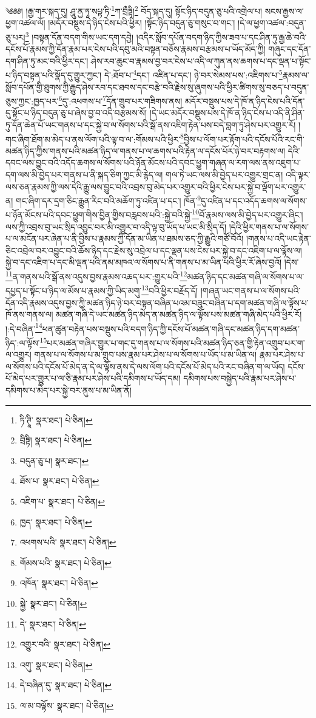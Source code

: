 \setcounter{footnote}{0} 
༄༅༅། །རྒྱ་གར་སྐད་དུ། ཤཱུ་ནྱ་ཏཱ་སཔྟ་ཏི་\footnote{ཏི་ཊཱི་  སྣར་ཐང་།  པེ་ཅིན། }ཀ་བྲྀཏྟི།\footnote{བྲིཏྟི།  སྣར་ཐང་།  པེ་ཅིན། } བོད་སྐད་དུ། སྟོང་ཉིད་བདུན་ཅུ་པའི་འགྲེལ་པ། སངས་རྒྱས་ལ་ཕྱག་འཚལ་ལོ། །མདོར་བསྡུས་དེ་ཉིད་ངེས་པའི་ཕྱིར། །སྟོང་ཉིད་བདུན་ཅུ་གསུང་བ་གང་། །དེ་ལ་ཕྱག་འཚལ་:བདུན་ཅུ་པར།\footnote{བདུན་ཅུ་པ།  སྣར་ཐང་། } །བསྟན་དོན་བདག་གིས་ཡང་དག་དབྱེ། །འདིར་སློབ་དཔོན་བདག་ཉིད་ཀྱིས་ཟབ་པ་དང་ཤིན་ཏུ་རྒྱ་ཆེ་བའི་དངོས་པོ་རྣམས་ཀྱི་དོན་རྣམ་པར་ངེས་པའི་དབུ་མའི་བསྟན་བཅོས་རྣམས་བརྩམས་པ་ཡོད་མོད་ཀྱི། གཞུང་དང་དོན་དག་ཤིན་ཏུ་མང་བའི་ཕྱིར་དང་། ཤེས་རབ་ཆུང་བ་རྣམས་བྱ་བར་ངེས་པ་འདི་ལ་ཀུན་ནས་ཆགས་པ་དང་ལྡན་པ་སྟོང་པ་ཉིད་བསྟན་པའི་སྣོད་དུ་གྱུར་ཀྱང་། དེ་:ཐོབ་པ་\footnote{ཐོས་པ་  སྣར་ཐང་།  པེ་ཅིན། }དང་། འཛིན་པ་དང་། ཉེ་བར་སེམས་པས་:འཇིགས་པ་\footnote{འཇིག་པ་  སྣར་ཐང་།  པེ་ཅིན། }རྣམས་ལ་སློབ་དཔོན་གྱི་ཐུགས་ཀྱི་རྒྱུད་ཤེས་རབ་དང་ཐབས་དང་བརྩེ་བའི་རྗེས་སུ་ཞུགས་པའི་ཕྱིར་ཚིགས་སུ་བཅད་པ་བདུན་ཅུས་ཀྱང་:ཁྱད་པར་\footnote{ཁྱད་  སྣར་ཐང་།  པེ་ཅིན། }དུ་:འཕགས་པ་\footnote{འཕགས་པའི་  སྣར་ཐང་།  པེ་ཅིན། }དོན་གྲུབ་པར་གཟིགས་ནས། མདོར་བསྡུས་པས་དེ་ཁོ་ན་ཉིད་ངེས་པའི་དོན་དུ་སྟོང་པ་ཉིད་བདུན་ཅུ་པ་ཞེས་བྱ་བ་འདི་བརྩམས་སོ། །དེ་ཡང་མདོར་བསྡུས་པས་དེ་ཁོ་ན་ཉིད་ངེས་པ་འདི་ནི་ཤིན་ཏུ་དོན་ཆེན་པོ་ཡང་གནས་པ་དང་སྐྱེ་བ་ལ་སོགས་པའི་སྒོ་ནས་འཇིག་རྟེན་པས་བདེ་བླག་ཏུ་ཤེས་པར་འགྱུར་རོ། །གང་ཞིག་ཐོག་མ་མེད་པ་ནས་ལོག་པའི་ལྟ་བ་ལ་:གོམས་པའི་ཕྱིར་\footnote{གོམས་པའི་  སྣར་ཐང་།  པེ་ཅིན། }བྱིས་པ་ལོག་པར་རྟོག་པའི་དངོས་པོའི་རང་གི་མཚན་ཉིད་ཀྱིས་གནས་པའི་མཚན་ཉིད་ལ་གནས་པ་ལ་ཆགས་པའི་རྟེན་ལ་དངོས་པོར་ཉེ་བར་བརྟགས་ལ། དེའི་དབང་ལས་བྱུང་བའི་འདོད་ཆགས་ལ་སོགས་པའི་ཉོན་མོངས་པའི་དབང་ཕྱུག་གཞན་ལ་རག་ལས་ནས་འཇུག་པ་དག་ལས་མི་བྱེད་པར་གནས་པ་ནི་སྐད་ཅིག་ཀྱང་མི་རྙེད་ལ། གལ་ཏེ་ཡང་ལས་མི་བྱེད་པར་འགྱུར་གྲང་ན། འདི་ལྟར་ལས་ཅན་རྣམས་ཀྱི་ལས་དེའི་རྒྱུ་ལས་བྱུང་བའི་འབྲས་བུ་མེད་པར་འགྱུར་བའི་ཕྱིར་ངེས་པར་སྐྱེ་བ་ལྡོག་པར་འགྱུར་ན། གང་ཞིག་དར་དྲག་ཅིང་རྒྱུན་རིང་བའི་མཆོག་ཏུ་འཛིན་པ་དང་། ཁོན་\footnote{འཁོན་  སྣར་ཐང་།  པེ་ཅིན། }དུ་འཛིན་པ་དང་འདོད་ཆགས་ལ་སོགས་པ་ཉོན་མོངས་པའི་དབང་ཕྱུག་གིས་བྱིན་གྱིས་བརླབས་པའི་:སྐྱེ་བའི་སྐྱེ་\footnote{སྐྱེ་  སྣར་ཐང་།  པེ་ཅིན། }བོ་རྣམས་ལས་མི་བྱེད་པར་འགྱུར་ཞིང་། ལས་ཀྱི་འབྲས་བུ་ཡང་སྲིད་འབྱུང་བར་མི་འགྱུར་བ་འདི་ལྟ་བུ་ཡོད་པ་ཡང་མི་སྲིད་དོ། །དེའི་ཕྱིར་གནས་པ་ལ་སོགས་པ་ལ་མངོན་པར་ཞེན་པ་ནི་བྱིས་པ་རྣམས་ཀྱི་དོན་མ་ཡིན་པ་ཐམས་ཅད་ཀྱི་རྒྱུའི་གཙོ་བོའོ། །གནས་པ་འདི་ཡང་རྟེན་ཅིང་འབྲེལ་བར་འབྱུང་བའི་ཆོས་ཉིད་དང་རྗེས་སུ་འབྲེལ་པ་དང་ལྡན་པས་ངེས་པར་སྐྱེ་བ་དང་འཇིག་པ་ལ་ལྟོས་ལ། སྐྱེ་བ་དང་འཇིག་པ་དང་མི་ལྡན་པའི་ནམ་མཁའ་ལ་སོགས་པ་ནི་གནས་པ་མ་ཡིན་པའི་ཕྱིར་རོ་ཞེས་བྱའོ། །དེས་\footnote{དེ་  སྣར་ཐང་།  པེ་ཅིན། }ན་གནས་པའི་སྒོ་ནས་འདུས་བྱས་རྣམས་འཆད་པར་:གྱུར་པའི་\footnote{འགྱུར་བའི་  སྣར་ཐང་།  པེ་ཅིན། }མཚན་ཉིད་དང་མཚན་གཞི་ལ་སོགས་པ་ལ་དཔྱད་པ་སྟོང་པ་ཉིད་ལ་མོས་པ་རྣམས་ཀྱི་ཡིད་མགུ་\footnote{འགུ་  སྣར་ཐང་།  པེ་ཅིན། }བའི་ཕྱིར་བརྗོད་དོ། །གཞན་ཡང་གནས་པ་ལ་སོགས་པའི་དོན་འདི་རྣམས་འདུས་བྱས་ཀྱི་མཚན་ཉིད་ཉེ་བར་བསྟན་བཞིན་པའམ་བཟུང་བཞིན་པ་དག་མཚན་གཞི་ལ་ལྟོས་པ་ཁོ་ནས་གནས་ལ། མཚན་གཞི་དེ་ཡང་མཚན་ཉིད་མེད་ན་མཚན་ཉིད་ལ་ལྟོས་པས་མཚན་གཞི་མེད་པའི་ཕྱིར་རོ། །:དེ་བཞིན་\footnote{དེ་བཞིན་དུ་  སྣར་ཐང་།  པེ་ཅིན། }ཕན་ཚུན་བརྟེན་པས་བསྡུས་པའི་བདག་ཉིད་ཀྱི་དངོས་པོ་མཚན་གཞི་དང་མཚན་ཉིད་དག་མཚན་ཉིད་:ལ་ལྟོས་\footnote{ལ་མ་བལྟོས་  སྣར་ཐང་།  པེ་ཅིན། }པར་མཚན་གཞིར་གྱུར་པ་གང་དུ་གནས་པ་ལ་སོགས་པའི་མཚན་ཉིད་ཅན་གྱི་རྟེན་འགྲུབ་པར་ག་ལ་འགྱུར། གནས་པ་ལ་སོགས་པ་མ་གྲུབ་པས་རྣམ་པར་ཤེས་པ་ལ་སོགས་པ་ཡོད་པ་མ་ཡིན་ལ། རྣམ་པར་ཤེས་པ་ལ་སོགས་པའི་དངོས་པོ་མེད་ན་དེ་ལ་ལྟོས་ནས་དེ་ལས་ལོག་པའི་དངོས་པོ་མེད་པའི་རང་བཞིན་ག་ལ་ཡོད། དངོས་པོ་མེད་པར་གྱུར་པ་ལ་ཅི་རྣམ་པར་ཤེས་པའི་དམིགས་པ་ཡོད་དམ། དམིགས་པས་བསྐྱེད་པའི་རྣམ་པར་ཤེས་པ་དམིགས་པ་མེད་པར་སྐྱེ་བར་ནུས་པ་མ་ཡིན་ནོ། 